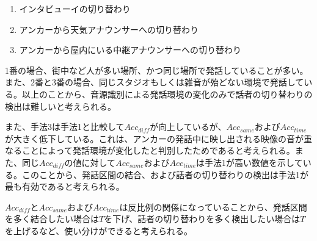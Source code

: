\begin{enumerate}
\item インタビューイの切り替わり
\item アンカーから天気アナウンサーへの切り替わり
\item アンカーから屋内にいる中継アナウンサーへの切り替わり
\end{enumerate}

1番の場合、街中など人が多い場所、かつ同じ場所で発話していることが多い。また、2番と3番の場合、同じスタジオもしくは雑音が殆どない環境で発話している。以上のことから、音源識別による発話環境の変化のみで話者の切り替わりの検出は難しいと考えられる。\par
また、手法3は手法1と比較して$Acc_{diff}$が向上しているが、$Acc_{same}$および$Acc_{time}$が大きく低下している。これは、アンカーの発話中に映し出される映像の音が重なることによって発話環境が変化したと判別したためであると考えられる。また、同じ$Acc_{diff}$の値に対して$Acc_{same}$および$Acc_{time}$は手法1が高い数値を示している。このことから、発話区間の結合、および話者の切り替わりの検出は手法1が最も有効であると考えられる。\par
$Acc_{diff}$と$Acc_{same}$および$Acc_{time}$は反比例の関係になっていることから、発話区間を多く結合したい場合は$T$を下げ、話者の切り替わりを多く検出したい場合は$T$を上げるなど、使い分けができると考えられる。
